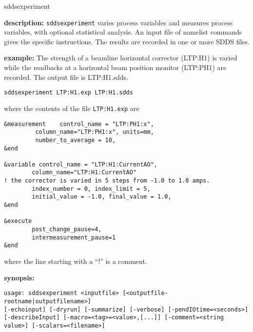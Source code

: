 \begin{sddsprog}{sddsexperiment}
\item {\bf description:}
\verb+sddsexperiment+ varies process variables and measures process variables, with optional statistical analysis.
An input file of namelist commands gives the specific instructions. 
The results are recorded in one or more SDDS files.
\item {\bf example:} 
% 
The strength of a beamline horizontal corrector (LTP:H1) is varied while the readbacks at a horizontal beam position
monitor (LTP:PH1) are recorded. The output file is LTP:H1.sdds.
\begin{verbatim}
sddsexperiment LTP:H1.exp LTP:H1.sdds
\end{verbatim}
where the contents of the file \verb+LTP:H1.exp+ are
\begin{verbatim}
&measurement    control_name = "LTP:PH1:x",
         column_name="LTP:PH1:x", units=mm,
         number_to_average = 10,
&end

&variable control_name = "LTP:H1:CurrentAO",
        column_name="LTP:H1:CurrentAO"
! the corrector is varied in 5 steps from -1.0 to 1.0 amps.
        index_number = 0, index_limit = 5,
        initial_value = -1.0, final_value = 1.0,
&end
        
&execute
        post_change_pause=4,
        intermeasurement_pause=1
&end
\end{verbatim}

where the line starting with a ``!'' is a comment.
\item {\bf synopsis:} 
\begin{verbatim}
usage: sddsexperiment <inputfile> [<outputfile-rootname|outputfilename>]
[-echoinput] [-dryrun] [-summarize] [-verbose] [-pendIOtime=<seconds>]
[-describeInput] [-macro=<tag>=<value>,[...]] [-comment=<string value>] [-scalars=<filename>]
\end{verbatim}


\end{sddsprog}
